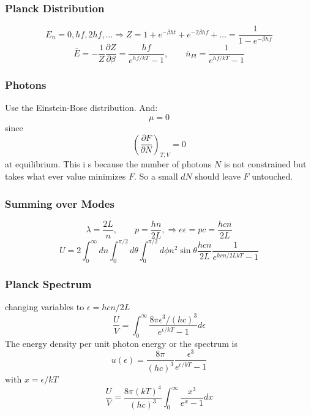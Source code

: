 \documentclass[a4paper,norsk, 10pt]{article}
\newcommand{\pd}[3]{\left(\frac{\partial #1}{\partial #2}\right)_{#3}}
\begin{document}
\subsubsection{Planck Distribution}
\begin{equation}
E_n = 0,hf,2hf,\ldots \Rightarrow Z = 1 + e^{-\beta ht} + e^{-2\beta hf}+ \ldots = \frac{1}{1-e^{-\beta hf}}
\end{equation}
\begin{equation}
\bar{E} = - \frac{1}{Z}\frac{\partial Z}{\partial \beta} = \frac{hf}{e^{hf/kT} - 1}, \qquad \bar{n}_{Pl} = \frac{1}{e^{hf/kT} - 1}
\end{equation}
\subsubsection{Photons}
Use the Einstein-Bose distribution. And:
\begin{equation}
\mu = 0
\end{equation}
since
\begin{equation}
\pd{F}{N}{T,V} = 0
\end{equation}
at equilibrium. This i s because the number of photons $N$ is not constrained but takes what ever value minimizes $F$. So a small $dN$ should leave $F$ untouched.
\subsubsection{Summing over Modes}
\begin{equation}
\lambda = \frac{2L}{n}, \qquad p = \frac{hn}{2L},\Rightarrow e\epsilon = pc = \frac{hcn}{2L}
\end{equation}
\begin{equation}
U = 2\int_0^{\infty}dn\int_0^{\pi/2}d\theta\int_0^{\pi/2}d\phi n^2\sin\theta \frac{hcn}{2L}\frac{1}{e^{hcn/2LkT}-1}
\end{equation}
\subsubsection{Planck Spectrum}
changing variables to $\epsilon = hcn/2L$
\begin{equation}
\frac{U}{V} = \int_0^\infty \frac{8\pi\epsilon^3/(hc)^3}{e^{\epsilon/kT}-1} d\epsilon
\end{equation}
The energy density per unit photon energy or the spectrum is
\begin{equation}
u(\epsilon) = \frac{8\pi}{(hc)^3}\frac{\epsilon^3}{e^{\epsilon/kT}-1}
\end{equation}
with $x = \epsilon/kT$
\begin{equation}
\frac{U}{V} = \frac{8\pi(kT)^4}{(hc)^3}\int_0^\infty\frac{x^3}{e^x - 1} dx
\end{equation}
\end{document}

